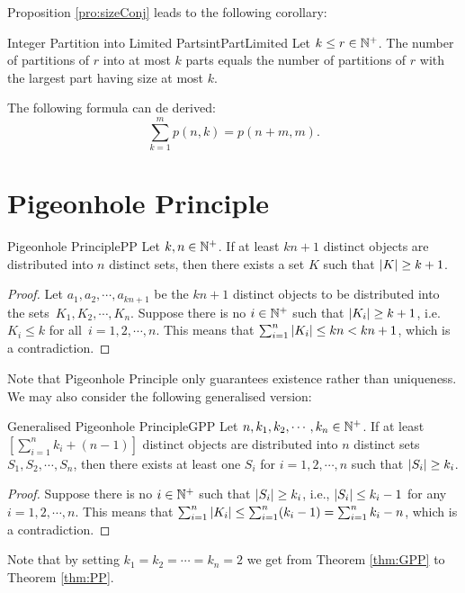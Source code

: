 \documentclass[math]{amznotes}
\theoremstyle{remark}
\newcommand{\0}{\mathbf{0}}
\newcommand{\1}{\mathbf{1}}
\begin{document}
Proposition \ref{pro:sizeConj} leads to the following corollary:
\begin{corbox}{Integer Partition into Limited Parts}{intPartLimited}
    Let $k \leq r \in \mathbb{N}^+$. The number of partitions of $r$ into at most $k$ parts equals the number of partitions of $r$ with the largest part having size at most $k$.
\end{corbox}
The following formula can de derived:
\begin{equation*}
    \sum_{k = 1}^{m}p(n, k) = p(n + m, m).
\end{equation*}
\section{Pigeonhole Principle}
\begin{thmbox}{Pigeonhole Principle}{PP}
    Let $k, n \in \mathbb{N}^+$. If at least $kn + 1$ distinct objects are distributed into $n$ distinct sets, then there exists a set $K$ such that ${\left\lvert {K} \right\rvert} \geq k + 1$.
    \tcblower   
    \begin{proof}
        Let $a_1, a_2, \cdots, a_{kn + 1}$ be the $kn + 1$ distinct objects to be distributed into the sets~$K_1, K_2, \cdots, K_n$. Suppose there is no $i \in \mathbb{N}^+$ such that ${\left\lvert {K_i} \right\rvert} \geq k + 1$, i.e. $K_i \leq k$ for all~$i = 1, 2, \cdots, n$. This means that $\sum_{i = 1}^{n}{\left\lvert {K_i} \right\rvert} \leq kn < kn + 1$, which is a contradiction.
    \end{proof}
\end{thmbox}
Note that Pigeonhole Principle only guarantees existence rather than uniqueness. We may also consider the following generalised version:
\begin{thmbox}{Generalised Pigeonhole Principle}{GPP}
    Let $n, k_1, k_2, \cdots, k_n \in \mathbb{N}^+$. If at least $\left[\sum_{i = 1}^{n}k_i + (n - 1)\right]$ distinct objects are distributed into $n$ distinct sets $S_1, S_2, \cdots, S_n$, then there exists at least one $S_i$ for $i = 1, 2, \cdots, n$ such that ${\left\lvert {S_i} \right\rvert} \geq k_i$.
    \tcblower   
    \begin{proof}
        Suppose there is no $i \in \mathbb{N}^+$ such that ${\left\lvert {S_i} \right\rvert} \geq k_i$, i.e., ${\left\lvert {S_i} \right\rvert} \leq k_i - 1$ for any~$i = 1, 2, \cdots, n$. This means that $\sum_{i = 1}^{n}{\left\lvert {K_i} \right\rvert} \leq \sum_{i = 1}^{n}(k_i - 1) = \sum_{i = 1}^{n}k_i - n$, which is a contradiction.
    \end{proof}
\end{thmbox}
Note that by setting $k_1 = k_2 = \cdots = k_n = 2$ we get from Theorem \ref{thm:GPP} to Theorem \ref{thm:PP}.
\end{document}
